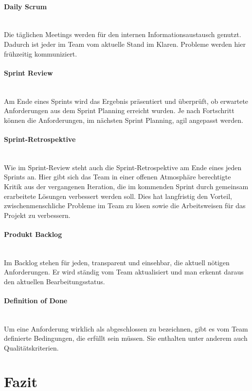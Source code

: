 \documentclass[a4paper, ngerman, 12pt, usenames, dvipsnames]{article}
\begin{document}
    \paragraph{Daily Scrum}\mbox{} \\
    Die täglichen Meetings werden für den internen Informationsaustausch genutzt.
    Dadurch ist jeder im Team vom aktuelle Stand im Klaren. 
    Probleme werden hier frühzeitig kommuniziert.
    \paragraph{Sprint Review}\mbox{} \\
    Am Ende eines Sprints wird das Ergebnis präsentiert und überprüft, ob erwartete Anforderungen aus dem Sprint Planning erreicht wurden.
    Je nach Fortschritt können die Anforderungen, im nächsten Sprint Planning, agil angepasst werden.
    \paragraph{Sprint-Retrospektive}\mbox{} \\
    Wie im Sprint-Review steht auch die Sprint-Retrospektive am Ende eines jeden Sprints an. Hier gibt sich das Team in einer offenen Atmosphäre berechtigte Kritik aus der vergangenen Iteration, die im kommenden Sprint durch gemeinsam erarbeitete Lösungen verbessert werden soll.
    Dies hat langfristig den Vorteil, zwischenmenschliche Probleme im Team zu lösen sowie die Arbeitsweisen für das Projekt zu verbessern.
    \paragraph{Produkt Backlog}\mbox{} \\
    Im Backlog stehen für jeden, transparent und einsehbar, die aktuell nötigen Anforderungen. 
    Er wird ständig vom Team aktualisiert und man erkennt daraus den aktuellen Bearbeitungsstatus.
    \paragraph{Definition of Done}\mbox{} \\
    Um eine Anforderung wirklich als abgeschlossen zu bezeichnen, gibt es vom Team definierte Bedingungen, die erfüllt sein müssen.
    Sie enthalten unter anderem auch Qualitätskriterien.

\section{Fazit}



\end{document}
